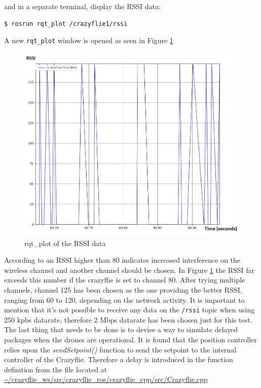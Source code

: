 \noindent and in a separate terminal, display the RSSI data:

\begin{mdframed}[backgroundcolor=light-gray, linecolor=light-gray]
\begin{verbatim}
$ rosrun rqt_plot /crazyflie1/rssi
\end{verbatim}
\end{mdframed}

\noindent A new \texttt{rqt\_plot} window is opened as seen in Figure \ref{figure:rssi}
\begin{figure}[H]
\centering
 \includegraphics[scale=0.4]{Figures/rssi_data.png}
 \caption{rqt\_plot of the RSSI data}
 \label{figure:rssi}
\end{figure}

\noindent According to \cite{book_ros} an RSSI higher than 80 indicates increased interference on the wireless channel and another channel should be chosen. In Figure \ref{figure:rssi} the RSSI far exceeds this number if the crazyflie is set to channel 80. After trying multiple channels, channel 125 has been chosen as the one providing the better RSSI, ranging from 60 to 120, depending on the network activity. It is important to mention that it's not possible to receive any data on the \texttt{/rssi} topic when using 250 kpbs datarate, therefore 2 Mbps datarate has been chosen just for this test.\\

The last thing that needs to be done is to devise a way to simulate delayed packages when the drones are operational. It is found that the position controller relies upon the \textit{sendSetpoint()} function to send the setpoint to the internal controller of the Crazyflie. Therefore a delay is introduced in the function definition from the file located at \url{~/crazyflie_ws/src/crazyflie_ros/crazyflie_cpp/src/Crazyflie.cpp}

